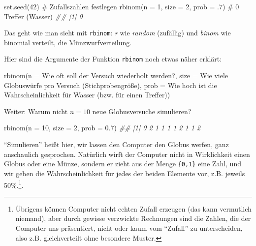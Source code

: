 \documentclass[
  a4paper,
  DIV=11]{scrreprt}
\newenvironment{Shaded}{\begin{snugshade}}{\end{snugshade}}
\newcommand{\AttributeTok}[1]{\textcolor[rgb]{0.40,0.45,0.13}{#1}}
\newcommand{\CommentTok}[1]{\textcolor[rgb]{0.37,0.37,0.37}{#1}}
\newcommand{\DecValTok}[1]{\textcolor[rgb]{0.68,0.00,0.00}{#1}}
\newcommand{\DocumentationTok}[1]{\textcolor[rgb]{0.37,0.37,0.37}{\textit{#1}}}
\newcommand{\FloatTok}[1]{\textcolor[rgb]{0.68,0.00,0.00}{#1}}
\newcommand{\FunctionTok}[1]{\textcolor[rgb]{0.28,0.35,0.67}{#1}}
\newcommand{\NormalTok}[1]{\textcolor[rgb]{0.00,0.23,0.31}{#1}}
\theoremstyle{definition}
\theoremstyle{remark}
\begin{document}
\begin{Shaded}
\begin{Highlighting}[]
\FunctionTok{set.seed}\NormalTok{(}\DecValTok{42}\NormalTok{)  }\CommentTok{\# Zufallszahlen festlegen}
\FunctionTok{rbinom}\NormalTok{(}\AttributeTok{n =} \DecValTok{1}\NormalTok{, }\AttributeTok{size =} \DecValTok{2}\NormalTok{, }\AttributeTok{prob =}\NormalTok{ .}\DecValTok{7}\NormalTok{)  }\CommentTok{\# 0 Treffer (Wasser)}
\DocumentationTok{\#\# [1] 0}
\end{Highlighting}
\end{Shaded}

Das geht wie man sieht mit \texttt{rbinom}: \emph{r} wie \emph{random}
(zufällig) und \emph{binom} wie binomial verteilt, die
Münzwurfverteilung.

Hier sind die Argumente der Funktion \texttt{rbinom} noch etwas näher
erklärt:

\begin{Shaded}
\begin{Highlighting}[]
\FunctionTok{rbinom}\NormalTok{(}\AttributeTok{n =}\NormalTok{ Wie oft soll der Versuch wiederholt werden?,}
       \AttributeTok{size =}\NormalTok{ Wie viele Globuswürfe pro }\FunctionTok{Versuch}\NormalTok{ (Stichprobengröße),}
       \AttributeTok{prob =}\NormalTok{ Wie hoch ist die Wahrscheinlichkeit für }\FunctionTok{Wasser}\NormalTok{ (bzw. für einen Treffer))}
\end{Highlighting}
\end{Shaded}

Weiter: Warum nicht \(n=10\) neue Globusversuche simulieren?

\begin{Shaded}
\begin{Highlighting}[]
\FunctionTok{rbinom}\NormalTok{(}\AttributeTok{n =} \DecValTok{10}\NormalTok{, }\AttributeTok{size =} \DecValTok{2}\NormalTok{, }\AttributeTok{prob =} \FloatTok{0.7}\NormalTok{)}
\DocumentationTok{\#\#  [1] 0 2 1 1 1 1 2 1 1 2}
\end{Highlighting}
\end{Shaded}

``Simulieren'' heißt hier, wir lassen den Computer den Globus werfen,
ganz anschaulich gesprochen. Natürlich wirft der Computer nicht in
Wirklichkeit einen Globus oder eine Münze, sondern er zieht aus der
Menge \texttt{\{0,1\}} eine Zahl, und wir geben die Wahrscheinlichkeit
für jedes der beiden Elemente vor, z.B. jeweils 50\%.\footnote{Übrigens
  können Computer nicht echten Zufall erzeugen (das kann vermutlich
  niemand), aber durch gewisse verzwickte Rechnungen sind die Zahlen,
  die der Computer uns präsentiert, nicht oder kaum vom ``Zufall'' zu
  unterscheiden, also z.B. gleichverteilt ohne besondere Muster.}.
\end{document}
